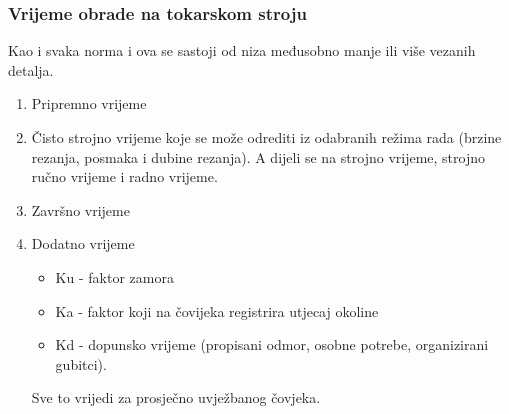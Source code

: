 \documentclass[a4paper,12pt]{article}
\numberwithin{figure}{section}
\begin{document}
\subsubsection{Vrijeme obrade na tokarskom stroju}
Kao i svaka norma i ova se sastoji od niza međusobno manje ili više vezanih detalja.
\begin{enumerate}
\item Pripremno vrijeme
\item Čisto strojno vrijeme koje se može odrediti iz odabranih režima rada (brzine rezanja, posmaka i dubine rezanja). A dijeli se na strojno vrijeme, strojno ručno vrijeme i radno vrijeme.
\item Završno vrijeme
\item Dodatno vrijeme
\begin{itemize}
\item Ku - faktor zamora
\item Ka - faktor koji na čovijeka registrira utjecaj okoline
\item Kd - dopunsko vrijeme (propisani odmor, osobne potrebe, organizirani gubitci).
\end{itemize}
Sve to vrijedi za prosječno uvježbanog čovjeka.
\end{enumerate}
\end{document}
